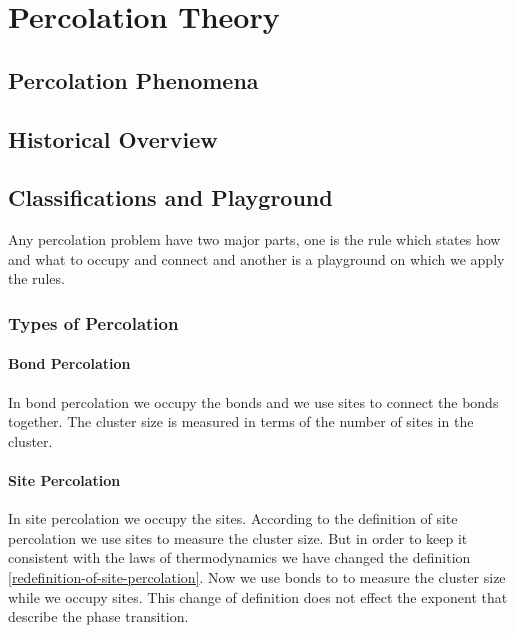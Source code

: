 \chapter{Percolation Theory}

\ifpdf
    \graphicspath{{Chapter4/Figs/}}
\else
    \graphicspath{{Chapter4/Figs/}}
\fi

\section{Percolation Phenomena}
\section{Historical Overview}
\section{Classifications and Playground}
	Any percolation problem have two major parts, one is the rule which states how and what to occupy and connect and another is a playground on which we apply the rules.
	\subsection{Types of Percolation}
		\subsubsection{Bond Percolation}
			In bond percolation we occupy the bonds and we use sites to connect the bonds together. The cluster size is measured in terms of the number of sites in the cluster.
		\subsubsection{Site Percolation}
			In site percolation we occupy the sites. According to the definition of site percolation we use sites to measure the cluster size. But in order to keep it consistent with the laws of thermodynamics we have changed the definition \ref{redefinition-of-site-percolation}. Now we use bonds to to measure the cluster size while we occupy sites. This change of definition does not effect the exponent that describe the phase transition.
